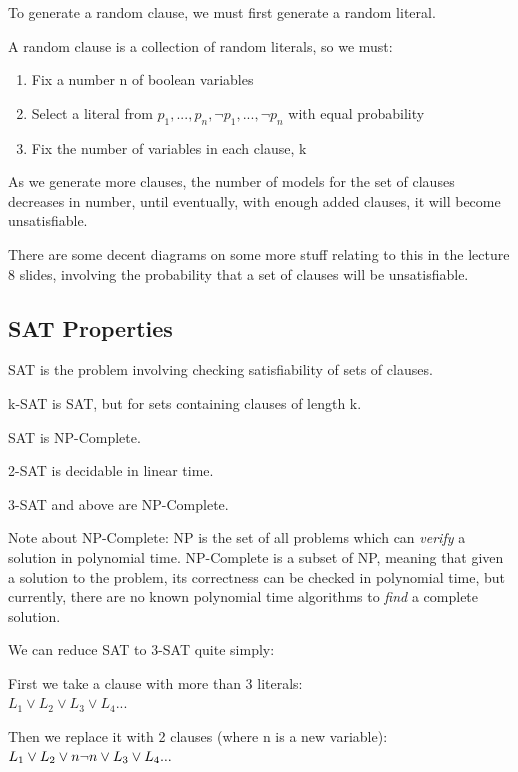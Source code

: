 \documentclass[11pt,a4paper]{article}
\begin{document}
To generate a random clause, we must first generate a random literal.

A random clause is a collection of random literals, so we must:

\begin{enumerate}
\item Fix a number n of boolean variables
\item Select a literal from $p_1, ..., p_n, \neg p_1, ..., \neg p_n$ with equal probability
\item Fix the number of variables in each clause, k
\end{enumerate}

As we generate more clauses, the number of models for the set of clauses decreases in number, until eventually, with enough added clauses, it will become unsatisfiable.

There are some decent diagrams on some more stuff relating to this in the lecture 8 slides, involving the probability that a set of clauses will be unsatisfiable.

\subsection{SAT Properties}

SAT is the problem involving checking satisfiability of sets of clauses.

k-SAT is SAT, but for sets containing clauses of length k.

SAT is NP-Complete.

2-SAT is decidable in linear time.

3-SAT and above are NP-Complete.

Note about NP-Complete: NP is the set of all problems which can \emph{verify} a solution in polynomial time. NP-Complete is a subset of NP, meaning that given a solution to the problem, its correctness can be checked in polynomial time, but currently, there are no known polynomial time algorithms to \emph{find} a complete solution.

\vspace{5pt}
We can reduce SAT to 3-SAT quite simply:

First we take a clause with more than 3 literals:\\ $L_1 \vee L_2 \vee L_3 \vee L_4...$

Then we replace it with 2 clauses (where n is a new variable):\\ $L_1 \vee L_2 \vee n \\ \neg n \vee L_3 \vee L_4 ...$
\end{document}
